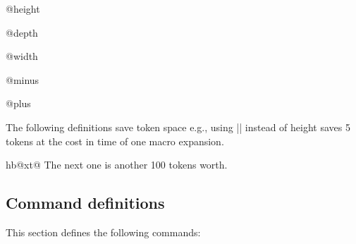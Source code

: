 \begin{docCommand}{@height} { }
\end{docCommand}

\begin{docCommand}{@depth} { }
\end{docCommand}

\begin{docCommand}{@width} { }
\end{docCommand}

\begin{docCommand}{@minus} { }
\end{docCommand}

\begin{docCommand}{@plus} { }
\end{docCommand}



The following definitions save token space  e.g., using
|\@height| instead of height saves 5 tokens at the cost in time
of one macro expansion.
    
\begin{teX}
\def\@height{height} \def\@depth{depth} \def\@width{width}
\def\@minus{minus}
\def\@plus{plus}
\end{teX}
\begin{docCommand}{hb@xt@} { }
The next one is another 100 tokens worth.
\end{docCommand}
\begin{teX}
\def\hb@xt@{\hbox to}
\end{teX}

\begin{teX}
\end{teX}

 \subsection{Command definitions}



 This section defines the following commands:
\let\marg\Arg

